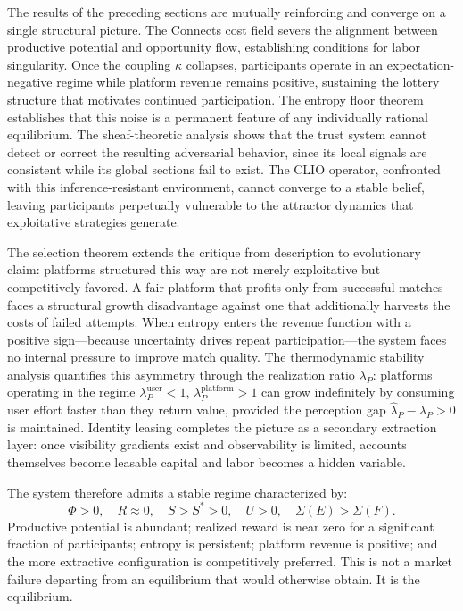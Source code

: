 \documentclass[11pt]{article}
\begin{document}
The results of the preceding sections are mutually reinforcing and converge
on a single structural picture. The Connects cost field severs the alignment
between productive potential and opportunity flow, establishing conditions
for labor singularity. Once the coupling $\kappa$ collapses, participants
operate in an expectation-negative regime while platform revenue remains
positive, sustaining the lottery structure that motivates continued
participation. The entropy floor theorem establishes that this noise is a
permanent feature of any individually rational equilibrium. The
sheaf-theoretic analysis shows that the trust system cannot detect or correct
the resulting adversarial behavior, since its local signals are consistent
while its global sections fail to exist. The CLIO operator, confronted with
this inference-resistant environment, cannot converge to a stable belief,
leaving participants perpetually vulnerable to the attractor dynamics that
exploitative strategies generate.

The selection theorem extends the critique from description to evolutionary
claim: platforms structured this way are not merely exploitative but
competitively favored. A fair platform that profits only from successful
matches faces a structural growth disadvantage against one that additionally
harvests the costs of failed attempts. When entropy enters the revenue
function with a positive sign---because uncertainty drives repeat
participation---the system faces no internal pressure to improve match
quality. The thermodynamic stability analysis quantifies this asymmetry
through the realization ratio $\lambda_P$: platforms operating in the regime
$\lambda_P^{\mathrm{user}} < 1$, $\lambda_P^{\mathrm{platform}} > 1$ can
grow indefinitely by consuming user effort faster than they return value,
provided the perception gap $\widehat{\lambda}_P - \lambda_P > 0$ is
maintained. Identity leasing completes the picture as a secondary extraction
layer: once visibility gradients exist and observability is limited, accounts
themselves become leasable capital and labor becomes a hidden variable.

The system therefore admits a stable regime characterized by:
\[
\Phi > 0, \quad R \approx 0, \quad S > S^* > 0, \quad U > 0, \quad
\Sigma(E) > \Sigma(F).
\]
Productive potential is abundant; realized reward is near zero for a
significant fraction of participants; entropy is persistent; platform
revenue is positive; and the more extractive configuration is competitively
preferred. This is not a market failure departing from an equilibrium that
would otherwise obtain. It is the equilibrium.
\end{document}
